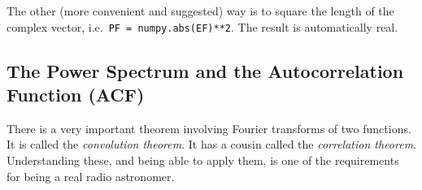 \documentclass[12pt,preprint]{aastex}
\begin{document}
\begin{enumerate}
The other (more convenient and suggested) way is to square the length of
the complex vector, i.e.\ \verb$PF = numpy.abs(EF)**2$. The result is
automatically real.

\end{enumerate}

\subsection{The Power Spectrum and the Autocorrelation Function
  (ACF)} \label{acf}

There is a very important theorem involving Fourier transforms of two
functions. It is called the {\it convolution theorem}. It has a cousin
called the {\it correlation theorem}. Understanding these, and being
able to apply them, is one of the requirements for being a real radio
astronomer. 
\end{document}
